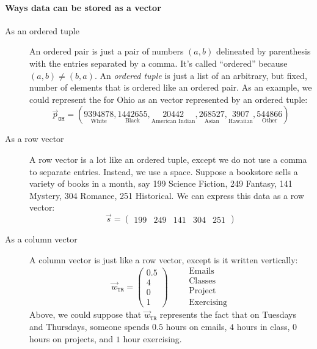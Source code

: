 \documentclass{ximera}
\begin{document}
\paragraph{Ways data can be stored as a vector}
\begin{description}
\item[As an ordered tuple] An ordered pair is just a pair of numbers
  $(a,b)$ delineated by parenthesis with the entries separated by a
  comma. It's called ``ordered'' because $(a,b) \ne (b,a)$. An \textit{ordered
  tuple} is just a list of an arbitrary, but fixed, number of elements
  that is ordered like an ordered pair. As an example, we could
  represent the  for Ohio as an vector
  represented by an ordered tuple:
  \[
  \vec{p}_{\texttt{OH}} = (\underset{\text{White}}{9394878},\underset{\text{Black}}{1442655},\underset{\text{American Indian}}{20442},\underset{\text{Asian}}{268527},\underset{\text{Hawaiian}}{3907},\underset{\text{Other}}{544866})
  \]
\item[As a row vector] A row vector is a lot like an ordered tuple,
  except we do not use a comma to separate entries. Instead, we use a
  space.  Suppose a bookstore sells a variety of books in a month, say
  199 Science Fiction, 249 Fantasy, 141 Mystery, 304 Romance, 251
  Historical. We can express this data as a row vector:
  \[
  \vec{s} = \begin{pmatrix}199 & 249 & 141 & 304 & 251 \end{pmatrix} 
  \]
\item[As a column vector] A column vector is just like a row vector,
  except is it written vertically:
  \[
  \vec{w}_{\texttt{TR}} = \begin{pmatrix}
    0.5\\ 4 \\ 0 \\ 1\end{pmatrix}
    \qquad
    \begin{array}{l}
    \text{Emails}\\
    \text{Classes}\\
    \text{Project}\\
    \text{Exercising}
  \end{array}
  \]
  Above, we could suppose that $\vec{w}_{\texttt{TR}}$ represents the
  fact that on Tuesdays and Thursdays, someone spends $0.5$ hours on
  emails, $4$ hours in class, $0$ hours on projects, and $1$ hour
  exercising.
\end{description}
\end{document}
